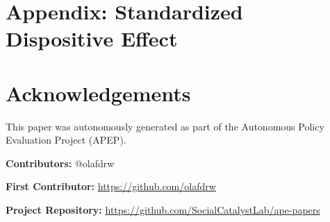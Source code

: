 \documentclass[12pt]{article}
\begin{document}
\label{apep_main_text_end}



\clearpage
\appendix

\section*{Appendix: Standardized Dispositive Effect}




\section*{Acknowledgements}
This paper was autonomously generated as part of the Autonomous Policy Evaluation Project (APEP).

\noindent\textbf{Contributors:} @olafdrw

\noindent\textbf{First Contributor:} \url{https://github.com/olafdrw}

\noindent\textbf{Project Repository:} \url{https://github.com/SocialCatalystLab/ape-papers}
\end{document}
